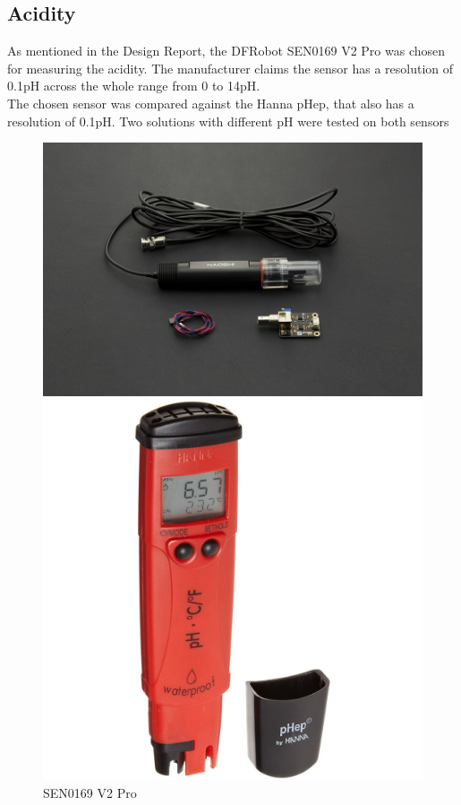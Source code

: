 \subsection{Acidity} \label{sensors:acidity}

As mentioned in the Design Report, the DFRobot SEN0169 V2 Pro \cite{SEN0169V2} was chosen for measuring the acidity. The manufacturer claims the sensor has a resolution of 0.1pH across the whole range from 0 to 14pH.\\

The chosen sensor was compared against the Hanna pHep, that also has a resolution of 0.1pH. \cite{hanna} Two solutions with different pH were tested on both sensors

\begin{figure}[h]
  \centering
  \begin{minipage}[b]{0.4\textwidth}
    \includegraphics[width=\textwidth]{sensors/12_gravityv2pro.jpg}
    \caption{SEN0169 V2 Pro \cite{SEN0169V2}}
  \end{minipage}
  \hfill
  \begin{minipage}[b]{0.3\textwidth}
    \includegraphics[width=\textwidth]{sensors/11_hanna.jpg}

\end{minipage}
\end{figure}
